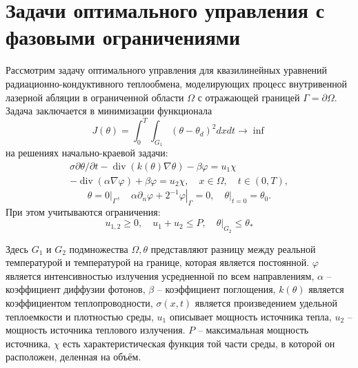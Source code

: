 

\section{Задачи оптимального управления с фазовыми ограничениями}
\label{sec:ch3:sec2}
%
Рассмотрим задачу оптимального
управления для квазилинейных уравнений радиационно-кондуктивного
теплообмена, моделирующих процесс внутривенной
лазерной абляции в ограниченной области $\Omega$ с отражающей границей $\Gamma=\partial\Omega$.
Задача заключается в минимизации функционала
\[ J(\theta)=\int_{0}^{T} \int_{G_{1}}\left(\theta-\theta_{d}\right)^{2} dx dt \rightarrow \inf \]
на решениях начально-краевой задачи:
\begin{equation}
    \label{eq:3_2:1}
    \begin{gathered}
        \sigma \partial \theta / \partial t-\operatorname{div}(k(\theta)
        \nabla \theta)-\beta \varphi=u_{1} \chi \\
        -\operatorname{div}(\alpha \nabla \varphi)+\beta \varphi=u_{2}
        \chi, \quad x \in \Omega, \quad t \in(0, T),
    \end{gathered}
\end{equation}
\begin{equation}
    \label{eq:3_2:2}
    \theta=\left.0\right|_{\Gamma},
    \quad \alpha \partial_{n} \varphi
    +\left.2^{-1} \varphi\right|_{\Gamma}=0,
    \left.\quad \theta\right|_{t=0}=\theta_{0}.
\end{equation}
При этом учитываются ограничения:
\[ u_{1,2} \geq 0, \quad u_{1}+u_{2} \leq P, \left.\quad \theta\right|_{G_{2}} \leq \theta_{*} \]

Здесь $G_{1}$ и $G_{2}$ подмножества $\Omega, \theta$
представляют разницу между реальной температурой
и температурой на границе, которая является постоянной.
$\varphi$ является интенсивностью излучения усредненной по всем направлениям,
$\alpha$ -- коэффициент диффузии фотонов, $\beta$ -- коэффициент поглощения,
$k(\theta)$ является коэффициентом теплопроводности, $\sigma(x, t)$
является произведением удельной теплоемкости и плотностью среды, $u_{1}$
описывает мощность источника тепла, $u_{2}$ -- мощность источника теплового излучения.
$P$ -- максимальная мощность источника,
$\chi$ есть характеристическая функция той части среды,
в которой он расположен, деленная на объём.

